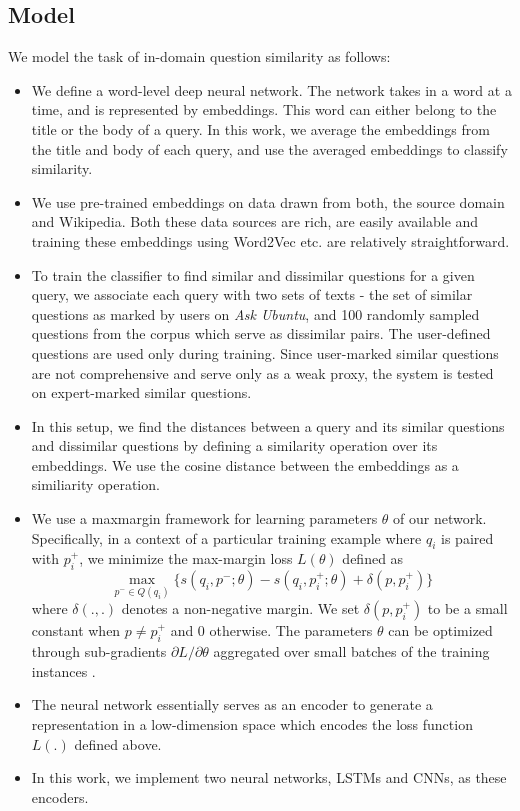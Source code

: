 \documentclass{sigkddExp}
\begin{document}
\subsection{Model}
We model the task of in-domain question similarity as follows:
\begin{itemize}[topsep=0pt,itemsep=-1ex,partopsep=1ex,parsep=1ex]
  \item We define a word-level deep neural network. The network takes in a word at a time, and is represented by embeddings.  This word can either belong to the title or the body of a query. In this work, we average the embeddings from the title and body of each query, and use the averaged embeddings to classify similarity.
  \item We use pre-trained embeddings on data drawn from both, the source domain and Wikipedia. Both these data sources are rich, are easily available and training these embeddings using Word2Vec etc. are relatively straightforward.
  \item To train the classifier to find similar and dissimilar questions for a given query, we associate each query with two sets of texts - the set of similar questions as marked by users on \textit{Ask Ubuntu}, and 100 randomly sampled questions from the corpus which serve as dissimilar pairs. The user-defined questions are used only during training. Since user-marked similar questions are not comprehensive and serve only as a weak proxy, the system is tested on expert-marked similar questions.
  \item In this setup, we find the distances between a query and its similar questions and dissimilar questions by defining a similarity operation over its embeddings. We use the cosine distance between the embeddings as a similiarity operation.
  \item We use a maxmargin framework for learning parameters $\theta$ of our network. Specifically, in a context of a particular training example where $q_i$ is paired with $p^+_i$, we minimize the max-margin loss $L(\theta)$ defined as\\
  \begin{equation}
  \max_{p^- \in Q(q_i)} \{s(q_i,p^-;\theta) - s(q_i,p^+_i;\theta) + \delta(p, p^+_i)\}
  \end{equation}
where $\delta(.,.)$ denotes a non-negative margin. We set $\delta(p, p^+_i)$ to be a small constant when $p \neq p^+_i$ and 0 otherwise. The parameters $\theta$ can be optimized through sub-gradients ${\partial L}/{\partial \theta}$ aggregated over small batches of the training instances \cite{lei2015semi}.
  \item The neural network essentially serves as an encoder to generate a representation in a low-dimension space which encodes the loss function $L(.)$ defined above.
  \item In this work, we implement two neural networks, LSTMs and CNNs, as these encoders.
\end{itemize}
\end{document}
